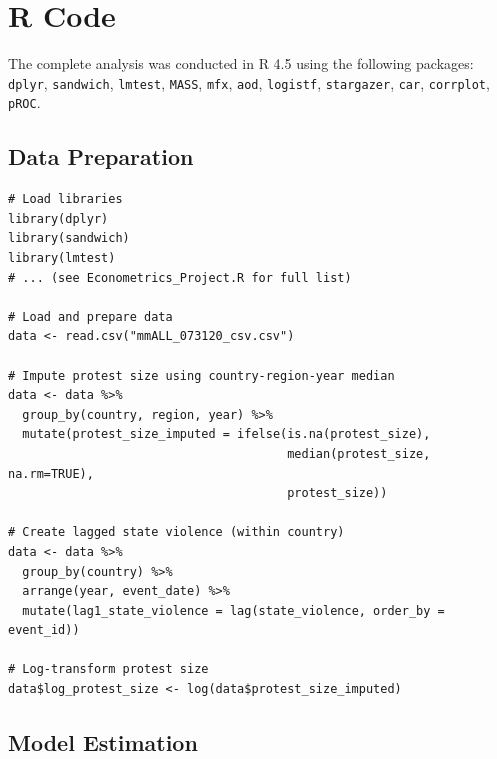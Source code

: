 \documentclass[11pt,a4paper]{article}
\begin{document}
\newpage
\appendix
\section{R Code}

The complete analysis was conducted in R 4.5 using the following packages:
\texttt{dplyr}, \texttt{sandwich}, \texttt{lmtest}, \texttt{MASS}, \texttt{mfx}, \texttt{aod}, \texttt{logistf}, \texttt{stargazer}, \texttt{car}, \texttt{corrplot}, \texttt{pROC}.

\subsection{Data Preparation}

\begin{verbatim}
# Load libraries
library(dplyr)
library(sandwich)
library(lmtest)
# ... (see Econometrics_Project.R for full list)

# Load and prepare data
data <- read.csv("mmALL_073120_csv.csv")

# Impute protest size using country-region-year median
data <- data %>%
  group_by(country, region, year) %>%
  mutate(protest_size_imputed = ifelse(is.na(protest_size),
                                       median(protest_size, na.rm=TRUE),
                                       protest_size))

# Create lagged state violence (within country)
data <- data %>%
  group_by(country) %>%
  arrange(year, event_date) %>%
  mutate(lag1_state_violence = lag(state_violence, order_by = event_id))

# Log-transform protest size
data$log_protest_size <- log(data$protest_size_imputed)
\end{verbatim}

\subsection{Model Estimation}
\end{document}
